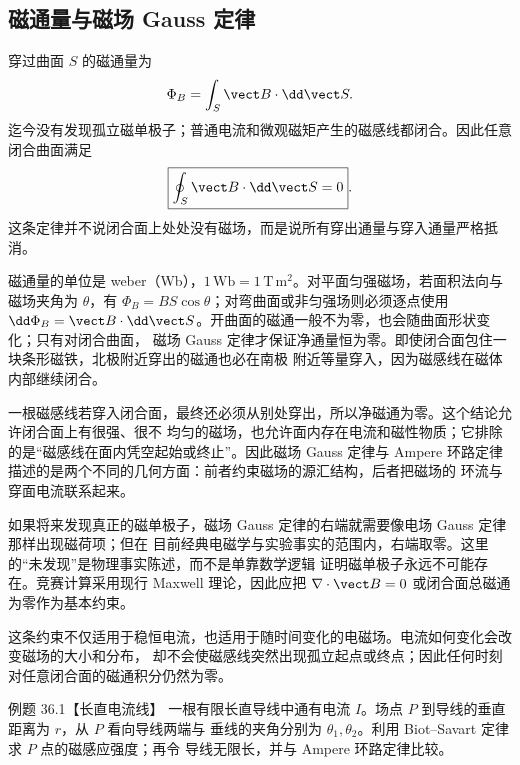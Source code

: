 \helmholtzDiagram

\motorHelmholtzContext

\subsection*{磁通量与磁场 Gauss 定律}

穿过曲面 $S$ 的磁通量为
\begin{equation}
  \Phi_B=\int_S\vect B\cdot\dd\vect S.
\end{equation}
迄今没有发现孤立磁单极子；普通电流和微观磁矩产生的磁感线都闭合。因此任意闭合曲面满足
\begin{equation}
  \boxed{\oint_S\vect B\cdot\dd\vect S=0}.
\end{equation}
这条定律并不说闭合面上处处没有磁场，而是说所有穿出通量与穿入通量严格抵消。

磁通量的单位是 weber（Wb），$1\,\mathrm{Wb}=1\,\mathrm{T\,m^2}$。对平面匀强磁场，若面积法向与
磁场夹角为 $\theta$，有 $\Phi_B=BS\cos\theta$；对弯曲面或非匀强场则必须逐点使用
$\dd\Phi_B=\vect B\cdot\dd\vect S$。开曲面的磁通一般不为零，也会随曲面形状变化；只有对闭合曲面，
磁场 Gauss 定律才保证净通量恒为零。即使闭合面包住一块条形磁铁，北极附近穿出的磁通也必在南极
附近等量穿入，因为磁感线在磁体内部继续闭合。

一根磁感线若穿入闭合面，最终还必须从别处穿出，所以净磁通为零。这个结论允许闭合面上有很强、很不
均匀的磁场，也允许面内存在电流和磁性物质；它排除的是“磁感线在面内凭空起始或终止”。因此磁场
Gauss 定律与 Ampere 环路定律描述的是两个不同的几何方面：前者约束磁场的源汇结构，后者把磁场的
环流与穿面电流联系起来。

如果将来发现真正的磁单极子，磁场 Gauss 定律的右端就需要像电场 Gauss 定律那样出现磁荷项；但在
目前经典电磁学与实验事实的范围内，右端取零。这里的“未发现”是物理事实陈述，而不是单靠数学逻辑
证明磁单极子永远不可能存在。竞赛计算采用现行 Maxwell 理论，因此应把
$\nabla\cdot\vect B=0$ 或闭合面总磁通为零作为基本约束。

这条约束不仅适用于稳恒电流，也适用于随时间变化的电磁场。电流如何变化会改变磁场的大小和分布，
却不会使磁感线突然出现孤立起点或终点；因此任何时刻对任意闭合面的磁通积分仍然为零。

\magneticGaussDiagram

\Needspace{0.18\textheight}
\begin{origexamplebox}{例题 36.1【长直电流线】}
一根有限长直导线中通有电流 $I$。场点 $P$ 到导线的垂直距离为 $r$，从 $P$ 看向导线两端与
垂线的夹角分别为 $\theta_1,\theta_2$。利用 Biot--Savart 定律求 $P$ 点的磁感应强度；再令
导线无限长，并与 Ampere 环路定律比较。
\end{origexamplebox}

